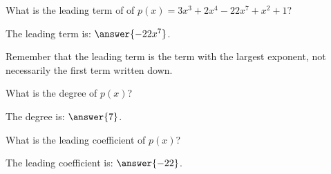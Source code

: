 \documentclass{ximera}
\begin{document}
\begin{question}
    What is the leading term of of $p(x) = 3x^3 + 2x^4 - 22x^7 + x^2 + 1$?
    
    The leading term is: $\answer{-22x^7}$.
    \begin{feedback}
        Remember that the leading term is the term with the largest exponent, not necessarily the first term written down.
    \end{feedback}
    \begin{question}
        What is the degree of $p(x)$?
        
        The degree is: $\answer{7}$.      
        \begin{question}
            What is the leading coefficient of $p(x)$?
            
            The leading coefficient is: $\answer{-22}$.
        \end{question}
    \end{question}
\end{question}
\end{document}
